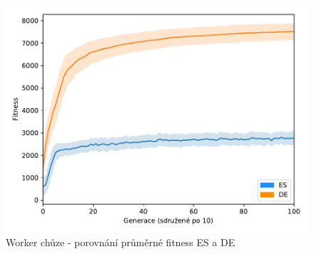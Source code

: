 		\begin{figure}[t]\centering
		\includegraphics[width=\columnwidth]{../img/WoodMap/DEvsES/WorkerWalkMem}
		\caption{Worker chůze - porovnání průměrné fitness ES a DE}
		\label{obr04:WWalkESvsDE}
	\end{figure}
	\clearpage 
	
	
	
